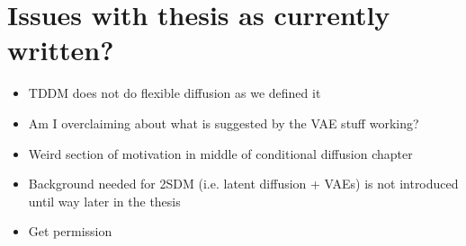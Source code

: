 \section*{Issues with thesis as currently written?}

\begin{itemize}
    \item TDDM does not do flexible diffusion as we defined it
    \item Am I overclaiming about what is suggested by the VAE stuff working?
    \item Weird section of motivation in middle of conditional diffusion chapter
    \item Background needed for 2SDM (i.e. latent diffusion + VAEs) is not introduced until way later in the thesis 
    \item Get permission
\end{itemize}


